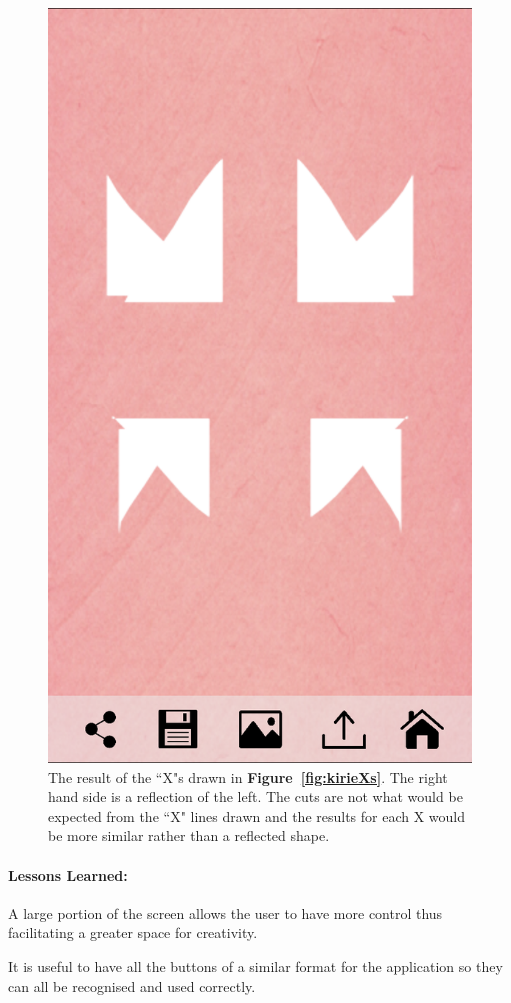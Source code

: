 \documentclass[11pt]{article}
\begin{document}
\begin{figure}[!ht]
\begin{minipage}{0.45\textwidth}
                            \includegraphics[width=0.7\linewidth]{Images/kirieCut}
                            \caption{The result of the ``X"s drawn in \textbf{Figure~\ref{fig:kirieXs}}. The right hand side is a reflection of the left. The cuts are not what would be expected from the ``X" lines drawn and the results for each X would be more similar rather than a reflected shape.}
                            \label{fig:kirieCut}
                        \end{minipage}
                    \end{figure}
                
                \paragraph{Lessons Learned:}    %
                A large portion of the screen allows the user to have more control thus facilitating a greater space for creativity.
                
                It is useful to have all the buttons of a similar format for the application so they can all be recognised and used correctly.
                
\end{document}
